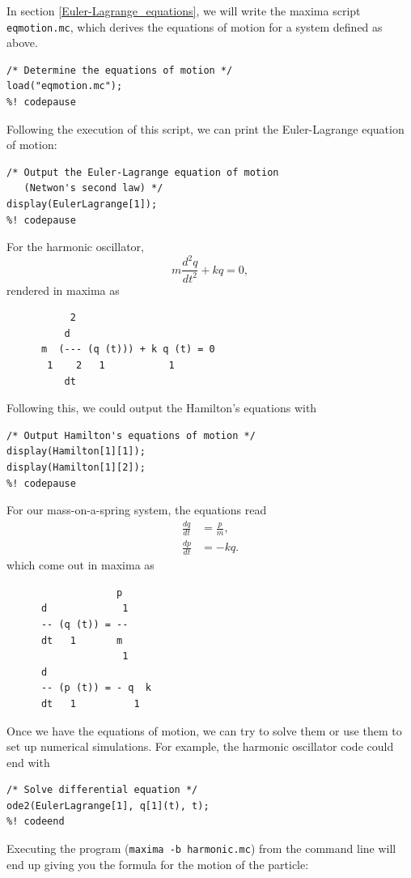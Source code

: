 \documentclass{article}
\begin{document}
In section \ref{Euler-Lagrange_equations}, we will write the maxima script
\texttt{eqmotion.mc}, which derives the equations of motion for a system defined
as above.
\begin{lstlisting}[frame=single]
%! codecontinue: harmonic.mc
/* Determine the equations of motion */
load("eqmotion.mc");
%! codepause
\end{lstlisting}
Following the execution of this script, we can print the Euler-Lagrange
equation of motion:
\begin{lstlisting}[frame=single]
%! codecontinue: harmonic.mc
/* Output the Euler-Lagrange equation of motion
   (Netwon's second law) */
display(EulerLagrange[1]);
%! codepause
\end{lstlisting}
For the harmonic oscillator,
\begin{equation*}
  m \frac{d^2 q}{dt^2} + k q = 0,
\end{equation*}
rendered in maxima as

\begin{minipage}{\textwidth}
\begin{verbatim}
           2
          d
      m  (--- (q (t))) + k q (t) = 0
       1    2   1           1
          dt
\end{verbatim}
\end{minipage}

Following this, we could output the Hamilton's equations with
\begin{lstlisting}[frame=single]
%! codecontinue: harmonic.mc
/* Output Hamilton's equations of motion */
display(Hamilton[1][1]);
display(Hamilton[1][2]);
%! codepause
\end{lstlisting}
For our mass-on-a-spring system, the equations read
\begin{align*}
  \frac{dq}{dt} & = \frac{p}{m}, \\
  \frac{dp}{dt} & = -k q.
\end{align*}
which come out in maxima as

\begin{minipage}{\textwidth}
\begin{verbatim}
                   p
      d             1
      -- (q (t)) = --
      dt   1       m
                    1
      d
      -- (p (t)) = - q  k
      dt   1          1
\end{verbatim}
\end{minipage}

Once we have the equations of motion, we can try to solve them or use them to
set up numerical simulations. For example, the harmonic oscillator code could
end with
\begin{lstlisting}[frame=single]
%! codecontinue: harmonic.mc
/* Solve differential equation */
ode2(EulerLagrange[1], q[1](t), t);
%! codeend
\end{lstlisting}
Executing the program (\texttt{maxima -b harmonic.mc}) from the command line
will end up giving you the formula for the motion of the particle:
\end{document}
